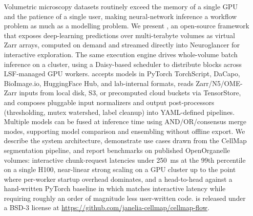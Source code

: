 
Volumetric microscopy datasets routinely exceed the memory of a single GPU and the patience of a single user, making neural-network inference a workflow problem as much as a modelling problem. We present \cellmapflow{}, an open-source framework that exposes deep-learning predictions over multi-terabyte volumes as virtual Zarr arrays, computed on demand and streamed directly into Neuroglancer for interactive exploration. The same execution engine drives whole-volume batch inference on a cluster, using a Daisy-based scheduler to distribute blocks across LSF-managed GPU workers. \cellmapflow{} accepts models in PyTorch TorchScript, DaCapo, BioImage.io, HuggingFace Hub, and lab-internal formats, reads Zarr/N5/OME-Zarr inputs from local disk, S3, or precomputed cloud buckets via TensorStore, and composes pluggable input normalizers and output post-processors (thresholding, mutex watershed, label cleanup) into YAML-defined pipelines. Multiple models can be fused at inference time using AND/OR/consensus merge modes, supporting model comparison and ensembling without offline export. We describe the system architecture, demonstrate use cases drawn from the CellMap segmentation pipeline, and report benchmarks on published OpenOrganelle volumes: interactive chunk-request latencies under 250~ms at the 99th percentile on a single H100, near-linear strong scaling on a GPU cluster up to the point where per-worker startup overhead dominates, and a head-to-head against a hand-written PyTorch baseline in which \cellmapflow{} matches interactive latency while requiring roughly an order of magnitude less user-written code. \cellmapflow{} is released under a BSD-3 license at \url{https://github.com/janelia-cellmap/cellmap-flow}.
